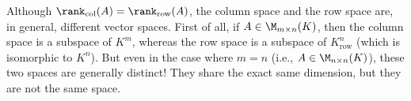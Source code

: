 \begin{importantremark}
Although $\rank_{\text{col}}(A) = \rank_{\text{row}}(A)$, the column space and the row space are, in general, different vector spaces. First of all, if $A \in \M_{m \times n}(K)$, then the column space is a subspace of $K^m$, whereas the row space is a subspace of $K_{\text{row}}^n$ (which is isomorphic to $K^n$). But even in the case where $m = n$ (i.e., $A \in \M_{n \times n}(K)$), these two spaces are generally distinct! They share the exact same dimension, but they are not the same space.
\end{importantremark}